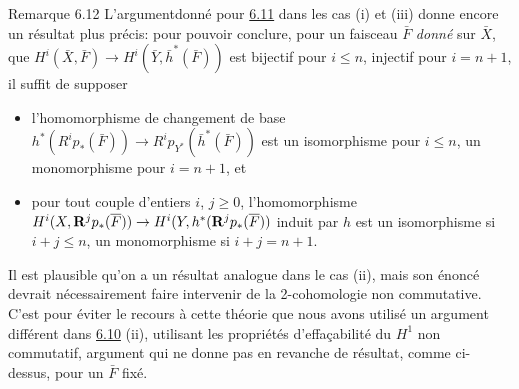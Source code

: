 \documentclass[10pt]{../fichiers-configuration-latex/smfart}
\begin{document}
\begin{enonce*}[remark]{Remarque 6.12}
L'argument\pageoriginale donné pour \hyperref[XII.prop6.11]{6.11} dans les cas (i) et (iii)
donne encore un résultat plus précis: pour pouvoir conclure, pour un
faisceau $\bar{F}$ \emph{donné} sur $\bar{X}$, que
$H^{i}(\bar{X},\bar{F})\rightarrow
H^{i}(\bar{Y},\bar{h}^{\ast}(\bar{F}))$ est bijectif pour $i\leq n$,
injectif pour $i=n+1$, il suffit de supposer
\begin{itemize}
\item[$1^{\circ}$)] l'homomorphisme de changement de base
$h^{\ast}(R^{i}p_{\ast}(\bar{F}))\rightarrow
R^{i}p_{Y^{\ast}}(\bar{h}^{\ast}(\bar{F}))$ est un isomorphisme pour
$i\leq n$, un monomorphisme pour $i=n+1$, et

\item[$2^{\circ}$)] pour tout couple d'entiers $i$, $j\geq 0$,
l'homomorphisme $H^{i}(X,\mathbf{R}^jp_{\ast}(\overline{F}))\rightarrow
H^{i}(Y,h^{\ast}(\mathbf{R}^jp_{\ast}(\overline{F}))$ induit par $h$ est un
isomorphisme si $i+j\leq n$, un monomorphisme si $i+j=n+1$.
\end{itemize}

Il est plausible qu'on a un résultat analogue dans le cas (ii), mais
son énoncé devrait nécessairement faire intervenir de la 2-cohomologie
non commutative. C'est pour éviter le recours à cette théorie que nous
avons utilisé un argument différent dans \hyperref[XII.cor6.10]{6.10} (ii), utilisant les
propriétés d'effaçabilité du $H^1$ non commutatif, argument qui ne
donne pas en revanche de résultat, comme ci-dessus, pour un $\bar{F}$ fixé.
\end{enonce*}
\end{document}
